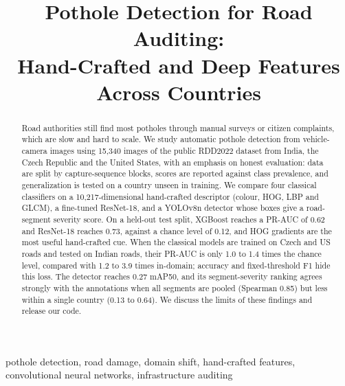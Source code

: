 \documentclass[conference]{IEEEtran}
\begin{document}
\title{Pothole Detection for Road Auditing:\\ Hand-Crafted and Deep Features Across Countries}

\author{
}

\maketitle

\begin{abstract}
Road authorities still find most potholes through manual surveys or citizen complaints, which are slow and hard to scale. We study automatic pothole detection from vehicle-camera images using 15,340 images of the public RDD2022 dataset from India, the Czech Republic and the United States, with an emphasis on honest evaluation: data are split by capture-sequence blocks, scores are reported against class prevalence, and generalization is tested on a country unseen in training. We compare four classical classifiers on a 10,217-dimensional hand-crafted descriptor (colour, HOG, LBP and GLCM), a fine-tuned ResNet-18, and a YOLOv8n detector whose boxes give a road-segment severity score. On a held-out test split, XGBoost reaches a PR-AUC of 0.62 and ResNet-18 reaches 0.73, against a chance level of 0.12, and HOG gradients are the most useful hand-crafted cue. When the classical models are trained on Czech and US roads and tested on Indian roads, their PR-AUC is only 1.0 to 1.4 times the chance level, compared with 1.2 to 3.9 times in-domain; accuracy and fixed-threshold F1 hide this loss. The detector reaches 0.27 mAP50, and its segment-severity ranking agrees strongly with the annotations when all segments are pooled (Spearman 0.85) but less within a single country (0.13 to 0.64). We discuss the limits of these findings and release our code.
\end{abstract}

\begin{IEEEkeywords}
pothole detection, road damage, domain shift, hand-crafted features, convolutional neural networks, infrastructure auditing
\end{IEEEkeywords}
\end{document}
